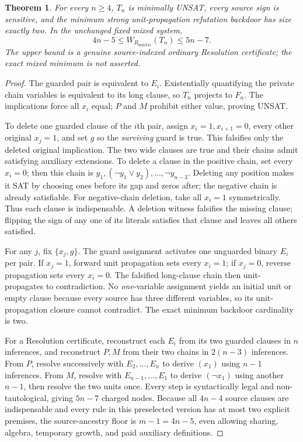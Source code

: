 \documentclass[11pt]{article}
\newtheorem{theorem}{Theorem}
\begin{document}
\begin{theorem}
For every $n\ge4$, $T_n$ is minimally UNSAT, every source sign is sensitive, and the minimum strong unit-propagation refutation backdoor has size \emph{exactly two}. In the unchanged fixed mixed system,
\[
\boxed{4n-5\le W_{R_{\mathrm{mix341}}}(T_n)\le 5n-7.}
\]
The upper bound is a genuine source-indexed ordinary Resolution certificate; the exact mixed minimum is not asserted.
\end{theorem}
\begin{proof}
The guarded pair is equivalent to $E_i$. Existentially quantifying the private chain variables is equivalent to its long clause, so $T_n$ projects to $F_n$. The implications force all $x_i$ equal; $P$ and $M$ prohibit either value, proving UNSAT.

To delete one guarded clause of the $i$th pair, assign $x_i=1,x_{i+1}=0$, every other original $x_j=1$, and set $g$ so the \emph{surviving} guard is true. This falsifies only the deleted original implication. The two wide clauses are true and their chains admit satisfying auxiliary extensions. To delete a clause in the positive chain, set every $x_i=0$; then this chain is $y_1,(\neg y_1\vee y_2),\ldots,\neg y_{n-3}$. Deleting any position makes it SAT by choosing ones before its gap and zeros after; the negative chain is already satisfiable. For negative-chain deletion, take all $x_i=1$ symmetrically. Thus each clause is indispensable. A deletion witness falsifies the missing clause; flipping the sign of any one of its literals satisfies that clause and leaves all others satisfied.

For any $j$, fix $\{x_j,g\}$. The guard assignment activates one unguarded binary $E_i$ per pair. If $x_j=1$, forward unit propagation sets every $x_i=1$; if $x_j=0$, reverse propagation sets every $x_i=0$. The falsified long-clause chain then unit-propagates to contradiction. No \emph{one}-variable assignment yields an initial unit or empty clause because every source has three different variables, so its unit-propagation closure cannot contradict. The exact minimum backdoor cardinality is two.

For a Resolution certificate, reconstruct each $E_i$ from its two guarded clauses in $n$ inferences, and reconstruct $P,M$ from their two chains in $2(n-3)$ inferences. From $P$, resolve successively with $E_2,\ldots,E_n$ to derive $(x_1)$ using $n-1$ inferences. From $M$, resolve with $E_{n-1},\ldots,E_1$ to derive $(\neg x_1)$ using another $n-1$, then resolve the two units once. Every step is syntactically legal and non-tautological, giving $5n-7$ charged nodes. Because all $4n-4$ source clauses are indispensable and every rule in this preselected version has at most two explicit premises, the source-ancestry floor is $m-1=4n-5$, even allowing sharing, algebra, temporary growth, and paid auxiliary definitions.
\end{proof}
\end{document}
